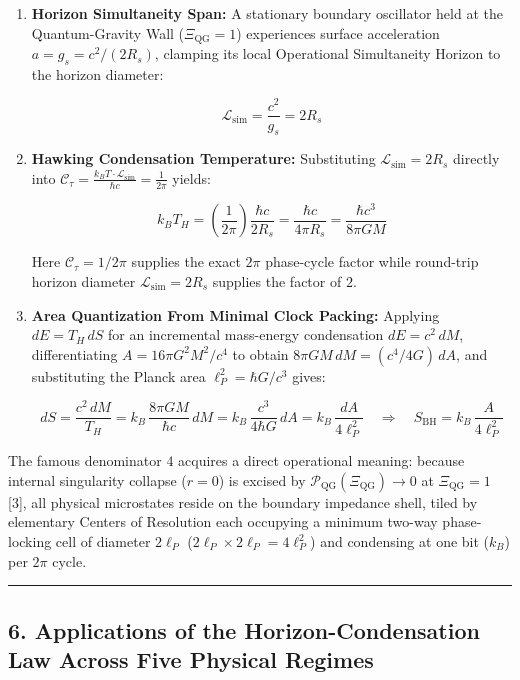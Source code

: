 \documentclass[
]{article}
\begin{document}
\begin{enumerate}
\def\labelenumi{\arabic{enumi}.}
\item
  \textbf{Horizon Simultaneity Span:} A stationary boundary oscillator
  held at the Quantum-Gravity Wall (\(\Xi_{\mathrm{QG}} = 1\))
  experiences surface acceleration \(a = g_s = c^2/(2R_s)\), clamping
  its local Operational Simultaneity Horizon to the horizon diameter:

  \[\mathcal{L}_{\mathrm{sim}} = \frac{c^2}{g_s} = 2 R_s\]
\item
  \textbf{Hawking Condensation Temperature:} Substituting
  \(\mathcal{L}_{\mathrm{sim}} = 2 R_s\) directly into
  \(\mathcal{C}_\tau = \frac{k_B T \cdot \mathcal{L}_{\mathrm{sim}}}{\hbar c} = \frac{1}{2\pi}\)
  yields:

  \[k_B T_H = \left(\frac{1}{2\pi}\right)\frac{\hbar c}{2 R_s} = \frac{\hbar c}{4\pi R_s} = \frac{\hbar c^3}{8\pi G M}\]

  Here \(\mathcal{C}_\tau = 1/2\pi\) supplies the exact \(2\pi\)
  phase-cycle factor while round-trip horizon diameter
  \(\mathcal{L}_{\mathrm{sim}} = 2R_s\) supplies the factor of \(2\).
\item
  \textbf{Area Quantization From Minimal Clock Packing:} Applying
  \(dE = T_H\,dS\) for an incremental mass-energy condensation
  \(dE = c^2\,dM\), differentiating \(A = 16\pi G^2 M^2 / c^4\) to
  obtain \(8\pi G M\,dM = (c^4/4G)\,dA\), and substituting the Planck
  area \(\ell_P^2 = \hbar G / c^3\) gives:

  \[dS = \frac{c^2\,dM}{T_H} = k_B\,\frac{8\pi G M}{\hbar c}\,dM = k_B\,\frac{c^3}{4\hbar G}\,dA = k_B\,\frac{dA}{4\ell_P^2} \quad \Longrightarrow \quad S_{\mathrm{BH}} = k_B\,\frac{A}{4\ell_P^2}\]
\end{enumerate}

The famous denominator \textbf{\(4\)} acquires a direct operational
meaning: because internal singularity collapse (\(r = 0\)) is excised by
\(\mathcal{P}_{\mathrm{QG}}(\Xi_{\mathrm{QG}}) \to 0\) at
\(\Xi_{\mathrm{QG}} = 1\) {[}3{]}, all physical microstates reside on
the boundary impedance shell, tiled by elementary Centers of Resolution
each occupying a minimum two-way phase-locking cell of diameter
\(2\ell_P\) (\(2\ell_P \times 2\ell_P = 4\ell_P^2\)) and condensing at
one bit (\(k_B\)) per \(2\pi\) cycle.

\begin{center}\rule{0.5\linewidth}{0.5pt}\end{center}

\subsection{6. Applications of the Horizon-Condensation Law Across Five
Physical
Regimes}\label{applications-of-the-horizon-condensation-law-across-five-physical-regimes}
\end{document}
